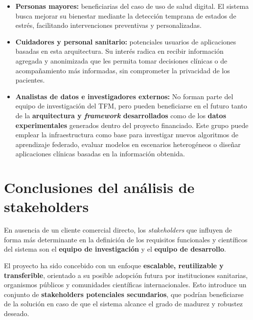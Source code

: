 \documentclass{report}
\begin{document}
\begin{description}
  \begin{itemize}
      \item \textbf{Personas mayores:} beneficiarias del caso de uso de salud digital. El sistema busca mejorar su bienestar mediante la detección temprana de estados de estrés, facilitando intervenciones preventivas y personalizadas.
      \item \textbf{Cuidadores y personal sanitario:} potenciales usuarios de aplicaciones basadas en esta arquitectura. Su interés radica en recibir información agregada y anonimizada que les permita tomar decisiones clínicas o de acompañamiento más informadas, sin comprometer la privacidad de los pacientes.
       \item \textbf{Analistas de datos e investigadores externos:}  
      No forman parte del equipo de investigación del TFM, pero pueden beneficiarse en el futuro tanto de la \textbf{arquitectura y \textit{framework} desarrollados} como de los \textbf{datos experimentales} generados dentro del proyecto financiado.  
      Este grupo puede emplear la infraestructura como base para investigar nuevos algoritmos de aprendizaje federado, evaluar modelos en escenarios heterogéneos o diseñar aplicaciones clínicas basadas en la información obtenida.  
  \end{itemize}
\end{description}

\section*{Conclusiones del análisis de stakeholders}%
En ausencia de un cliente comercial directo, los \textit{stakeholders} que influyen de forma más determinante en la definición de los requisitos funcionales y científicos del sistema son el \textbf{equipo de investigación} y el \textbf{equipo de desarrollo}.

El proyecto ha sido concebido con un enfoque \textbf{escalable, reutilizable y transferible}, orientado a su posible adopción futura por instituciones sanitarias, organismos públicos y comunidades científicas internacionales. Esto introduce un conjunto de \textbf{stakeholders potenciales secundarios}, que podrían beneficiarse de la solución en caso de que el sistema alcance el grado de madurez y robustez deseado.
\end{document}
